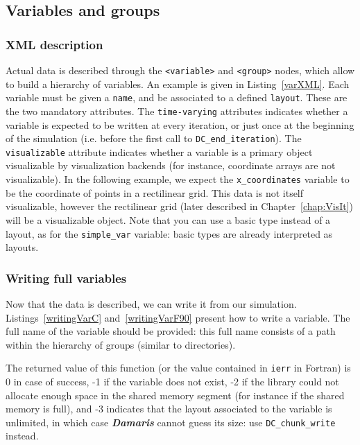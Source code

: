 \documentclass[11pt]{report}
\newcommand{\Damaris}{\emph{\textbf{Damaris}}}
\newcommand{\function}[1]{\texttt{#1}}
\begin{document}
\subsection{Variables and groups}

\subsubsection{XML description}

Actual data is described through the \texttt{<variable>} and \texttt{<group>} nodes, which
allow to build a hierarchy of variables. An example is given in Listing~\ref{varXML}.
Each variable must be given a \texttt{name}, and be associated to a defined \texttt{layout}.
These are the two mandatory attributes. The \texttt{time-varying} attributes indicates whether
a variable is expected to be written at every iteration, or just once at the beginning of the
simulation (i.e. before the first call to \function{DC\_end\_iteration}). 
The \texttt{visualizable} attribute indicates whether a variable is a primary object visualizable
by visualization backends (for instance, coordinate arrays are not visualizable). 
In the following example, we expect the \texttt{x\_coordinates} variable
to be the coordinate of points in a rectilinear grid. This data is not itself visualizable, however
the rectilinear grid (later described in Chapter~\ref{chap:VisIt}) will be a visualizable object.
Note that you can use a basic type instead of a layout, as for the \texttt{simple\_var} variable: 
basic types are already interpreted as layouts.

\noindent\begin{minipage}{\textwidth}
\vspace{0.5cm}

\end{minipage}

\subsubsection{Writing full variables}

Now that the data is described, we can write it from our simulation. 
Listings~\ref{writingVarC} and~\ref{writingVarF90} present how to write a variable. 
The full name of the variable should be provided: this full name consists of a path within
the hierarchy of groups (similar to directories).

The returned value of this function (or the value contained in \texttt{ierr} in Fortran) is
0 in case of success, -1 if the variable does not exist, -2 if the library could not allocate
enough space in the shared memory segment (for instance if the shared memory is full),
and -3 indicates that the layout associated to the variable is unlimited, in which case \Damaris{}
cannot guess its size: use \function{DC\_chunk\_write} instead.
\end{document}
